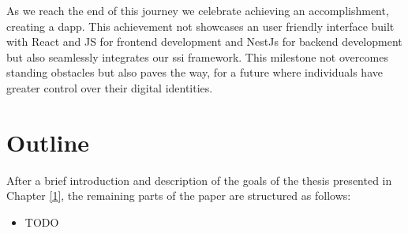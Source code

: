 As we reach the end of this journey we celebrate achieving an accomplishment, creating a \gls{dapp}. This achievement not showcases an user friendly interface 
built with React and JS for frontend development and NestJs for backend development but also seamlessly integrates our \gls{ssi} framework. This milestone not overcomes standing 
obstacles but also paves the way, for a future where individuals have greater control over their digital identities.

\section{Outline}

After a brief introduction and description of the goals of the thesis presented in Chapter 
\hyperref[ch:introduction]{[1]}, the remaining parts of the paper are structured as follows:

\begin{itemize}
    \item TODO
\end{itemize}



